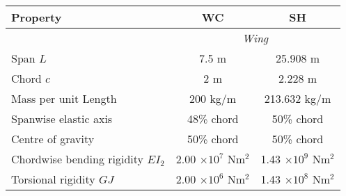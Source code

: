 \documentclass{standalone}
\begin{document}
    \centering
    \begin{tabular}{l c c}
    \toprule
    \toprule
    Property&WC&SH\\
    \midrule
    &\multicolumn{2}{c}{\textit{Wing}}\\
    Span $L$     & 7.5 m  & 25.908 m  \\
    Chord $c$   & 2 m & 2.228 m \\
    Mass per unit Length     & 200 kg/m & 213.632 kg/m\\
    Spanwise elastic axis   & 48\% chord & 50\% chord\\
    Centre of gravity   & 50\% chord& 50\% chord\\
    Chordwise bending rigidity $EI_2$   & 2.00 $\times 10^7$ Nm$^2$ & 1.43 $\times 10^9$ Nm$^2$\\
    Torsional rigidity $GJ$ & 2.00 $\times 10^6$ Nm$^2$& 1.43 $\times 10^8$ Nm$^2$\\
    \bottomrule
    \bottomrule
    \end{tabular}
    
\end{document}
